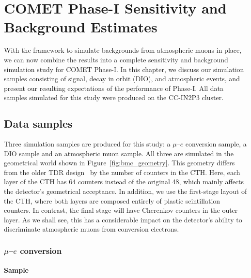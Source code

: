 \chapter{COMET Phase-I Sensitivity and Background Estimates}
\label{ch:phase-I_study}

With the framework to simulate backgrounds from atmospheric muons in place, we
can now combine the results into a complete sensitivity and background
simulation study for COMET Phase\nobreakdash-I. In this chapter, we discuss our
simulation samples consisting of signal, decay in orbit (DIO), and atmospheric
events, and present our resulting expectations of the performance of
Phase\nobreakdash-I. All data samples simulated for this study were produced
on the CC-IN2P3 cluster.

\section{Data samples}
Three simulation samples are produced for this study: a $\mu$--$e$ conversion
sample, a DIO sample and an atmospheric muon sample. All three are simulated in
the geometrical world shown in Figure~\ref{fig:bmc_geometry}. This geometry
differs from the older TDR design~\cite{the_comet_collaboration_comet_2020} by
the number of counters in the CTH. Here, each layer of the CTH has 64 counters
instead of the original 48, which mainly affects the detector's geometrical
acceptance. In addition, we use the first-stage layout of the CTH, where both
layers are composed entirely of plastic scintillation counters. In contrast, the
final stage will have Cherenkov counters in the outer layer. As we shall see,
this has a considerable impact on the detector's ability to discriminate
atmospheric muons from conversion electrons.

\subsection{\texorpdfstring{$\mu$--$e$}{Muon-to-electron} conversion} 

\subsubsection{Sample}

